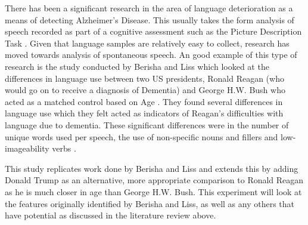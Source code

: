 \documentclass[10pt]{article}
\begin{document}
\par 
There has been a significant research in the area of language deterioration as a means of detecting Alzheimer's Disease. This usually takes the form analysis of speech recorded as part of a cognitive assessment such as the Picture Description Task \cite{Orimaye2014,Fraser2015}. Given that language samples are relatively easy to collect, research has moved towards analysis of spontaneous speech. An good example of this type of research is the study conducted by Berisha and Liss which looked at the differences in language use between two US presidents, Ronald Reagan (who would go on to receive a diagnosis of Dementia) and George H.W. Bush who acted as a matched control based on Age \cite{Berisha2015}. They found several differences in language use which they felt acted as indicators of Reagan's difficulties with language due to dementia. These significant differences were in the number of unique words used per speech, the use of non-specific nouns and fillers and low-imageability verbs \cite{Berisha2015}. 
\par   
This study replicates work done by Berisha and Liss and extends this by adding Donald Trump as an alternative, more appropriate comparison to Ronald Reagan as he is much closer in age than George H.W. Bush. This experiment will look at the features originally identified by Berisha and Liss, as well as any others that have potential as discussed in the literature review above. 
\end{document}
